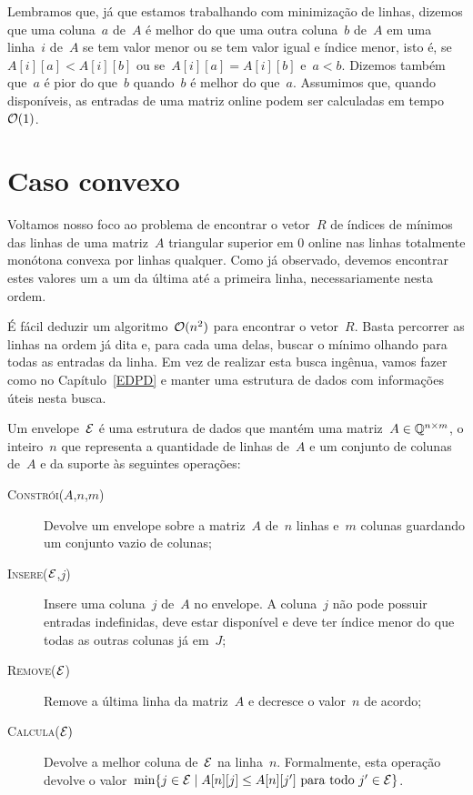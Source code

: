 Lembramos que, já que estamos trabalhando com minimização de linhas, dizemos que uma coluna~$a$ de~$A$ é melhor do que uma outra coluna~$b$ de~$A$ em uma linha~$i$ de~$A$ se tem valor menor ou se tem valor igual e índice menor, isto é, se~$A[i][a] < A[i][b]$ ou se~$A[i][a] = A[i][b]$ e~$a < b$. Dizemos também que~$a$ é pior do que~$b$ quando~$b$ é melhor do que~$a$. Assumimos que, quando disponíveis, as entradas de uma matriz online podem ser calculadas em tempo~$\mathcal{O}(1)$.


\section{Caso convexo} \label{Online:convex}

Voltamos nosso foco ao problema de encontrar o vetor~$R$ de índices de mínimos das linhas de uma matriz~$A$ triangular superior em 0 online nas linhas totalmente monótona convexa por linhas qualquer. Como já observado, devemos encontrar estes valores um a um da última até a primeira linha, necessariamente nesta ordem. 

É fácil deduzir um algoritmo~$\mathcal{O}(n^2)$ para encontrar o vetor~$R$. Basta percorrer as linhas na ordem já dita e, para cada uma delas, buscar o mínimo olhando para todas as entradas da linha. Em vez de realizar esta busca ingênua, vamos fazer como no Capítulo~\ref{EDPD} e manter uma estrutura de dados com informações úteis nesta busca.

\begin{defi}[Envelope]
Um envelope~$\mathcal{E}$ é uma estrutura de dados que mantém uma matriz~${ A \in \mathbb{Q}^{ n \times m } }$, o inteiro~$n$ que representa a quantidade de linhas de~$A$ e um conjunto de colunas de~$A$ e da suporte às seguintes operações:

\begin{description}
    \item[\textsc{Constrói}($A$,$n$,$m$)] Devolve um envelope sobre a matriz~$A$ de~$n$ linhas e~$m$ colunas guardando um conjunto vazio de colunas;
    \item[\textsc{Insere}($\mathcal{E}$,$j$)] Insere uma coluna~$j$ de~$A$ no envelope. A coluna~$j$ não pode possuir entradas indefinidas, deve estar disponível e deve ter índice menor do que todas as outras colunas já em~$J$;
    \item[\textsc{Remove}($\mathcal{E}$)] Remove a última linha da matriz~$A$ e decresce o valor~$n$ de acordo;
    \item[\textsc{Calcula}($\mathcal{E})$] Devolve a melhor coluna de~$\mathcal{E}$ na linha~$n$. Formalmente, esta operação devolve o valor~${ \min\{ j \in \mathcal{E} \mid A[n][j] \leq A[n][j'] \text{ para todo } j' \in \mathcal{E} \} }$.
\end{description}
\end{defi}

